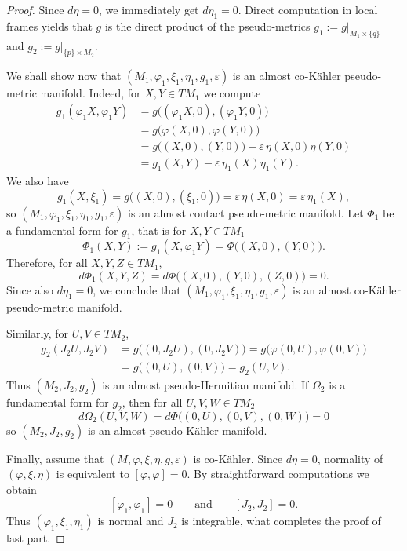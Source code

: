 \documentclass[10pt,a4paper]{amsart}
\numberwithin{equation}{section}
\newcommand{\eps}{\varepsilon}
\begin{document}
\begin{proof}
Since $d\eta=0$, we immediately get $d\eta_1=0$. Direct computation in local frames yields
 that $g$ is
the direct product of the pseudo-metrics $g_1:=g|_{M_1\times\{q\}}$ and $g_2:=g|_{\{p\}\times M_2}$.
\par We shall show now that $(M_1,\varphi_1,\xi_1,\eta_1,g_1,\eps)$ is an almost co-K\"ahler pseudo-metric manifold. Indeed, for $X,Y\in TM_1$ we compute
\begin{align*}
g_1(\varphi_1X,\varphi_1Y)
&=g\bigl((\varphi_1X,0),(\varphi_1Y,0)\bigr)\\
&=g\bigl(\varphi(X,0),\varphi(Y,0)\bigr)\\
&=g\bigl((X,0),(Y,0)\bigr)-\eps\,\eta(X,0)\eta(Y,0)\\
&=g_1(X,Y)-\eps\,\eta_1(X)\eta_1(Y).
\end{align*}
We also have
$$
g_1(X,\xi_1)=g\bigl((X,0),(\xi_1,0)\bigr)=\eps\,\eta(X,0)=\eps\,\eta_1(X),
$$
so $(M_1,\varphi_1,\xi_1,\eta_1,g_1,\eps)$ is an almost contact pseudo-metric manifold.
Let $\Phi_1$ be  a fundamental form for $g_1$, that is for $X,Y\in TM_1$
$$
\Phi_1(X,Y):=g_1(X,\varphi_1Y)=\Phi\bigl((X,0),(Y,0)\bigr).
$$
Therefore, for all $X,Y,Z\in TM_1$,
$$
d\Phi_1(X,Y,Z)=d\Phi\bigl((X,0),(Y,0),(Z,0)\bigr)=0.
$$
Since also $d\eta_1=0$, we conclude that $(M_1,\varphi_1,\xi_1,\eta_1,g_1,\eps)$ is an almost co-K\"ahler pseudo-metric manifold.
\par Similarly, for $U,V\in TM_2$,
\begin{align*}
g_2(J_2U,J_2V)
&=g\bigl((0,J_2U),(0,J_2V)\bigr)=g\bigl(\varphi(0,U),\varphi(0,V)\bigr)\\
&=g\bigl((0,U),(0,V)\bigr)=g_2(U,V).
\end{align*}
Thus $(M_2,J_2,g_2)$ is an almost pseudo-Hermitian manifold. If $\Omega_2$ is a fundamental form for $g_2$, then for all $U,V,W\in TM_2$
$$
d\Omega_2(U,V,W)=d\Phi\bigl((0,U),(0,V),(0,W)\bigr)=0
$$
so $(M_2,J_2,g_2)$ is an almost pseudo-K\"ahler manifold.

Finally, assume that $(M,\varphi,\xi,\eta,g,\eps)$ is co-K\"ahler. Since $d\eta=0$, normality of $(\varphi,\xi,\eta)$ is equivalent to $[\varphi,\varphi]=0$.
By straightforward computations we obtain
$$
[\varphi_1,\varphi_1]=0
\qquad\text{and}\qquad
[J_2,J_2]=0.
$$
Thus $(\varphi_1,\xi_1,\eta_1)$ is normal and $J_2$ is integrable, what completes the proof of last part.
\end{proof}
\end{document}
